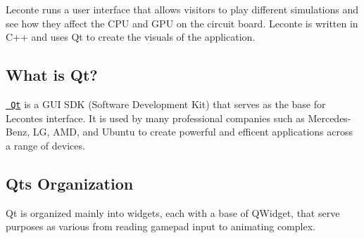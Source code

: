 Leconte runs a user interface that allows visitors to play different simulations and see how they affect the C\+PU and G\+PU on the circuit board. Leconte is written in C++ and uses Qt to create the visuals of the application.

\subsection*{What is Qt?}

\href{https://www.qt.io/}{\texttt{ Qt}} is a G\+UI S\+DK (Software Development Kit) that serves as the base for Leconte\textquotesingle{}s interface. It is used by many professional companies such as Mercedes-\/\+Benz, LG, A\+MD, and Ubuntu to create powerful and efficent applications across a range of devices.

\subsection*{Qt\textquotesingle{}s Organization}

Qt is organized mainly into widgets, each with a base of Q\+Widget, that serve purposes as various from reading gamepad input to animating complex. 